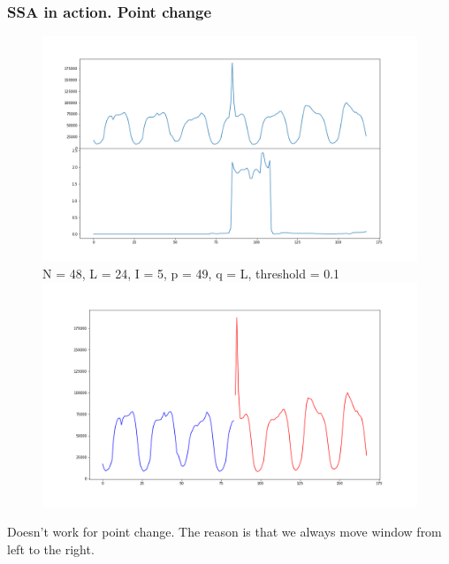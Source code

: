 \documentclass[intlimits, 9pt, unicode]{beamer}
\begin{document}
\begin{frame}
    \frametitle{SSA in action. Point change}

\begin{figure}
	\includegraphics[scale=0.10]{images/021_point_cp}
	N = 48, L = 24, I = 5, p = 49, q = L, threshold = 0.1
	\includegraphics[scale=0.10]{images/022_point_cp_detected}
\end{figure}

Doesn't work for point change.
The reason is that we always move window from left to the right.

\end{frame}
\end{document}
